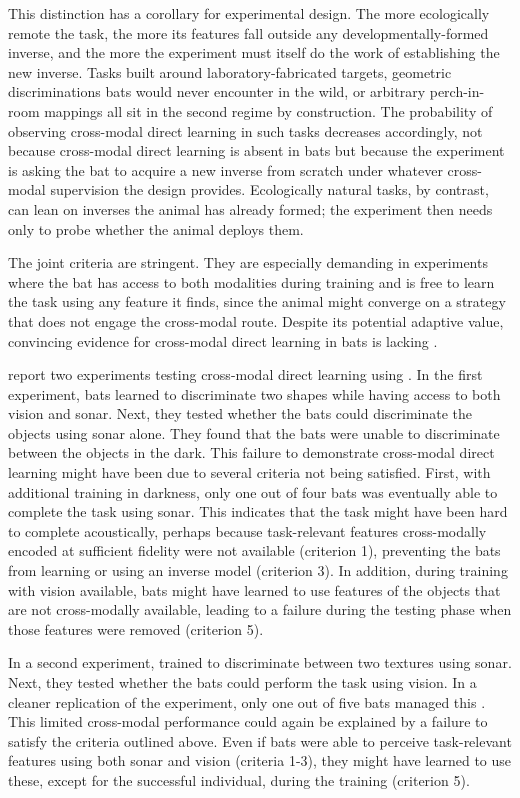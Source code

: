 \documentclass[11pt]{article}
\begin{document}
This distinction has a corollary for experimental design. The more ecologically remote the task, the more its features fall outside any developmentally-formed inverse, and the more the experiment must itself do the work of establishing the new inverse. Tasks built around laboratory-fabricated targets, geometric discriminations bats would never encounter in the wild, or arbitrary perch-in-room mappings all sit in the second regime by construction. The probability of observing cross-modal direct learning in such tasks decreases accordingly, not because cross-modal direct learning is absent in bats but because the experiment is asking the bat to acquire a new inverse from scratch under whatever cross-modal supervision the design provides. Ecologically natural tasks, by contrast, can lean on inverses the animal has already formed; the experiment then needs only to probe whether the animal deploys them.


The joint criteria are stringent. They are especially demanding in experiments where the bat has access to both modalities during training and is free to learn the task using any feature it finds, since the animal might converge on a strategy that does not engage the cross-modal route. Despite its potential adaptive value, convincing evidence for cross-modal direct learning in bats is lacking \citep[see also][]{Page2021}.


\citet{Danilovich2019} report two experiments testing cross-modal direct learning using . In the first experiment, bats learned to discriminate two shapes while having access to both vision and sonar. Next, they tested whether the bats could discriminate the objects using sonar alone. They found that the bats were unable to discriminate between the objects in the dark.
This failure to demonstrate cross-modal direct learning might have been due to several criteria not being satisfied. First, with additional training in darkness, only one out of four bats was eventually able to complete the task using sonar. This indicates that the task might have been hard to complete acoustically, perhaps because task-relevant features cross-modally encoded at sufficient fidelity were not available (criterion 1), preventing the bats from learning or using an inverse model (criterion 3). In addition, during training with vision available, bats might have learned to use features of the objects that are not cross-modally available, leading to a failure during the testing phase when those features were removed (criterion 5).


In a second experiment, \citet{Danilovich2019} trained  to discriminate between two textures using sonar. Next, they tested whether the bats could perform the task using vision. In a cleaner replication of the experiment, only one out of five bats managed this \citep[Round 2 in][]{Danilovich2019}. This limited cross-modal performance could again be explained by a failure to satisfy the criteria outlined above. Even if bats were able to perceive task-relevant features using both sonar and vision (criteria 1-3), they might have learned to use these, except for the successful individual, during the training (criterion 5).
\end{document}
